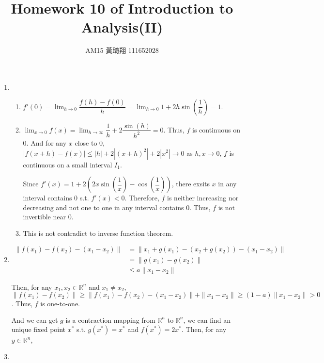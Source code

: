 \documentclass[12pt]{article}
\title{Homework 10 of Introduction to Analysis(II)}
\author{AM15 黃琦翔 111652028}
\begin{document}
\maketitle
\begin{enumerate}
    \item \begin{enumerate}
        \item $f'(0) = \displaystyle\lim_{h\to 0} \dfrac{f(h) - f(0)}{h} = \displaystyle\lim_{h\to 0} 1 + 2h\sin(\dfrac{1}{h}) = 1$.
        
        \item $\displaystyle\lim_{x\to 0} f(x) = \displaystyle\lim_{h\to \infty} \dfrac{1}{h} + 2\dfrac{\sin(h)}{h^2} = 0$.
        Thus, $f$ is continuous on $0$.
        And for any $x$ close to $0$, $|f(x+h) - f(x)| \leq |h| + 2|(x+h)^2| + 2|x^2| \to 0$ as $h, x \to 0$, $f$ is continuous on a small interval $I_1$.

        Since $f'(x) = 1 + 2(2x\sin(\dfrac{1}{x}) - \cos(\dfrac{1}{x}))$, there exsits $x$ in any interval contains $0$ s.t. $f'(x)< 0$.
        Therefore, $f$ is neither increasing nor decreasing and not one to one in any interval contains $0$.
        Thus, $f$ is not invertible near $0$.

        \item This is not contradict to inverse function theorem.
    \end{enumerate}

    \item \begin{align*}
        \| f(x_1) - f(x_2) - (x_1 - x_2)\| &= \| x_1 + g(x_1) - (x_2 + g(x_2)) - (x_1 - x_2) \| \\
        &= \| g(x_1) - g(x_2)\|\\
        &\leq a\| x_1 - x_2\|
    \end{align*}

    Then, for any $x_1, x_2\in \mathbb{R}^n$ and $x_1 \neq x_2$, $\| f(x_1) - f(x_2)\| \geq \|f(x_1) - f(x_2) - (x_1 - x_2)\| + \| x_1 - x_2\| \geq (1-a)\|x_1 - x_2\| > 0$.
    Thus, $f$ is one-to-one.

    And we can get $g$ is a contraction mapping from $\mathbb{R}^n$ to $\mathbb{R}^n$,
    we can find an unique fixed point $x^*$ s.t. $g(x^*) = x^*$ and $f(x^*) = 2x^*$.
    Then, for any $y \in \mathbb{R}^n$, 
   
    \item 

\end{enumerate}
\end{document}
